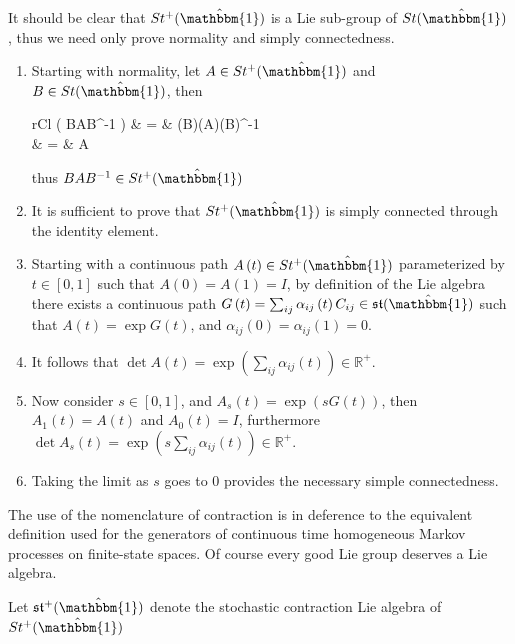 \begin{IEEEproof}
	It should be clear that $St^{+}(\hat{\mathbbm{1}})$ is a Lie sub-group of $St(\hat{\mathbbm{1}})$,
	thus we need only prove normality and simply connectedness.
	\begin{enumerate}
		\item Starting with normality, let $A \in St^{+}(\hat{\mathbbm{1}})$ and $B \in St(\hat{\mathbbm{1}})$,
		then
		\begin{IEEEeqnarray*}{rCl}
			\det \left( BAB^{-1} \right)
				& = & \left(\det B\right)\left(\det A\right)\left(\det B\right)^{-1}\\
				& = & \det A
		\end{IEEEeqnarray*}
		thus $BAB^{-1} \in St^{+}(\hat{\mathbbm{1}})$
		\item It is sufficient to prove that $St^{+}(\hat{\mathbbm{1}})$ is simply connected
		through the identity element.
		\item Starting with a continuous path $A\left(t\right) \in St^{+}(\hat{\mathbbm{1}})$
		parameterized by $t \in \left[0,1\right]$ such that $A\left(0\right) = A\left(1\right) = I$,
		by definition of the Lie algebra there exists a continuous path $G\left(t \right) = \sum_{ij} \alpha_{ij}\left(t\right) C_{ij} \in \mathfrak{st}(\hat{\mathbbm{1}})$ 
		such that $A\left(t\right) = \exp G\left(t\right)$, and $\alpha_{ij}\left(0\right) = \alpha_{ij}\left(1\right) = 0$.
		\item It follows that $\det A\left(t\right) = \exp\left(\sum_{ij} \alpha_{ij}\left(t\right)\right) \in \mathbb{R}^{+}$.
		\item Now consider $s \in \left[0,1\right]$, and $A_s\left(t\right) = \exp\left(sG\left(t\right)\right)$,
		then $A_1\left(t\right) = A\left(t\right)$ and $A_0\left(t\right) = I$,
		furthermore $\det A_s\left(t\right) = \exp\left(s \sum_{ij} \alpha_{ij}\left(t\right)\right) \in \mathbb{R}^{+}$.
		\item Taking the limit as $s$ goes to $0$ provides the necessary simple 
		connectedness.\hfill\IEEEQEDhere
	\end{enumerate}
\end{IEEEproof}
The use of the nomenclature of contraction is in deference to the equivalent definition used
for the generators of continuous time homogeneous Markov processes on finite-state spaces.
Of course every good Lie group deserves a Lie algebra.
\begin{definition}
	Let $\mathfrak{st}^{+}(\hat{\mathbbm{1}})$ denote the stochastic contraction Lie 
	algebra of $St^{+}(\hat{\mathbbm{1}})$
\end{definition}
